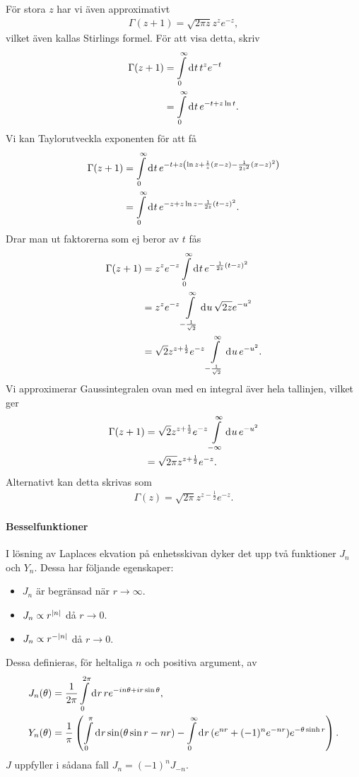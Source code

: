 För stora $z$ har vi även approximativt
\begin{align*}
	\Gamma(z + 1) = \sqrt{2\pi z}z^{z}e^{-z},
\end{align*}
vilket även kallas Stirlings formel. För att visa detta, skriv
\begin{align*}
	\Gamma(z + 1) &= \int\limits_{0}^{\infty}\dd[]{t}t^{z}e^{-t} \\
	              &= \int\limits_{0}^{\infty}\dd[]{t}e^{-t + z\ln{t}}.
\end{align*}
Vi kan Taylorutveckla exponenten för att få
\begin{align*}
	\Gamma(z + 1) &= \int\limits_{0}^{\infty}\dd[]{t}e^{-t + z\left(\ln{z} + \frac{1}{z}(x - z) - \frac{1}{2z^{2}}(x -z)^{2}\right)} \\
	              &= \int\limits_{0}^{\infty}\dd[]{t}e^{-z + z\ln{z} - \frac{1}{2z}(t - z)^{2}}.
\end{align*}
Drar man ut faktorerna som ej beror av $t$ fås
\begin{align*}
	\Gamma(z + 1) &= z^{z}e^{-z}\int\limits_{0}^{\infty}\dd[]{t}e^{-\frac{1}{2z}(t - z)^{2}} \\
	              &= z^{z}e^{-z}\int\limits_{-\frac{1}{\sqrt{2}}}^{\infty}\dd[]{u}\sqrt{2z}e^{-u^{2}} \\
	              &= \sqrt{2}z^{z + \frac{1}{2}}e^{-z}\int\limits_{-\frac{1}{\sqrt{2}}}^{\infty}\dd[]{u}e^{-u^{2}}.
\end{align*}
Vi approximerar Gaussintegralen ovan med en integral äver hela tallinjen, vilket ger
\begin{align*}
	\Gamma(z + 1) &= \sqrt{2}z^{z + \frac{1}{2}}e^{-z}\int\limits_{-\infty}^{\infty}\dd[]{u}e^{-u^{2}} \\
	              &= \sqrt{2\pi}z^{z + \frac{1}{2}}e^{-z}.
\end{align*}
Alternativt kan detta skrivas som
\begin{align*}
	\Gamma(z) = \sqrt{2\pi}z^{z - \frac{1}{2}}e^{-z}.
\end{align*}

\paragraph{Besselfunktioner}
I lösning av Laplaces ekvation på enhetsskivan dyker det upp två funktioner $J_{n}$ och $Y_{n}$. Dessa har följande egenskaper:
\begin{itemize}
	\item $J_{n}$ är begränsad när $r\to\infty$.
	\item $J_{n}\propto r^{\abs{n}}$ då $r\to 0$.
	\item $J_{n}\propto r^{-\abs{n}}$ då $r\to 0$.
\end{itemize}
Dessa definieras, för heltaliga $n$ och positiva argument, av
\begin{align*}
	J_{n}(\theta) &= \frac{1}{2\pi}\int\limits_{0}^{2\pi}\dd[]{r}re^{-in\theta + ir\sin{\theta}}, \\
	Y_{n}(\theta) &= \frac{1}{\pi}\left(\int\limits_{0}^{\pi}\dd[]{r}\sin(\theta\sin{r} - nr) - \int\limits_{0}^{\infty}\dd[]{r}(e^{nr} + (-1)^{n}e^{-nr})e^{-\theta\sinh{r}}\right).
\end{align*}
$J$ uppfyller i sådana fall $J_{n} = (-1)^{n}J_{-n}$.


